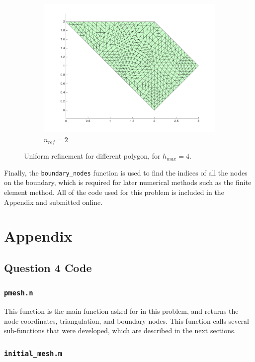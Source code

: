 \documentclass[10pt]{article}
\begin{document}
\begin{figure}[H]
\begin{subfigure}[b]{0.35\textwidth}
                \includegraphics[width=\textwidth]{refine-B2.png}
                \caption{\(n_{ref}=2\)}
        \end{subfigure}%
        \caption{Uniform refinement for different polygon, for \(h_{max}=4\).}
        \label{fig:2}
\end{figure}

Finally, the {\tt boundary\_nodes} function is used to find the indices of all the nodes on the boundary, which is required for later numerical methods such as the finite element method. All of the code used for this problem is included in the Appendix and submitted online. 

\section{Appendix}
\subsection{Question 4 Code}
\subsubsection{{\tt pmesh.n}}

This function is the main function asked for in this problem, and returns the node coordinates, triangulation, and boundary nodes. This function calls several sub-functions that were developed, which are described in the next sections. 



\subsubsection{{\tt initial\_mesh.m}}
\end{document}
